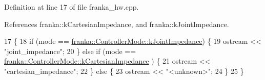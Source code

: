 Definition at line 17 of file franka\+\_\+hw.\+cpp.



References franka\+::k\+Cartesian\+Impedance, and franka\+::k\+Joint\+Impedance.


\begin{DoxyCode}
17                                                                        \{
18   \textcolor{keywordflow}{if} (mode == \hyperlink{namespacefranka_a3e20bc77587e2c0c53598753e3f4816baa7cd8fc7552b5b9c50684e57f032d724}{franka::ControllerMode::kJointImpedance}) \{
19     ostream << \textcolor{stringliteral}{"joint\_impedance"};
20   \} \textcolor{keywordflow}{else} \textcolor{keywordflow}{if} (mode == \hyperlink{namespacefranka_a3e20bc77587e2c0c53598753e3f4816bac2c3f2cf686f3debef77b3049958b488}{franka::ControllerMode::kCartesianImpedance}
      ) \{
21     ostream << \textcolor{stringliteral}{"cartesian\_impedance"};
22   \} \textcolor{keywordflow}{else} \{
23     ostream << \textcolor{stringliteral}{"<unknown>"};
24   \}
25 \}
\end{DoxyCode}
